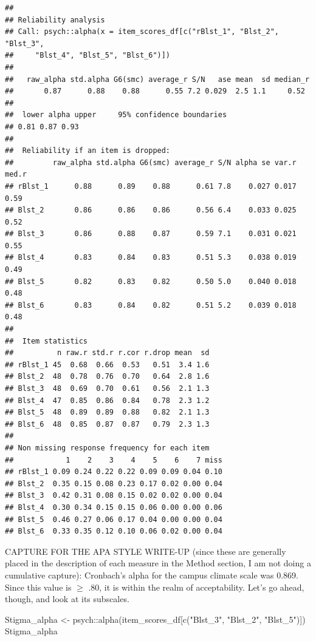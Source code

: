 \documentclass[
]{book}
\newenvironment{Shaded}{\begin{snugshade}}{\end{snugshade}}
\newcommand{\FunctionTok}[1]{\textcolor[rgb]{0.00,0.00,0.00}{#1}}
\newcommand{\NormalTok}[1]{#1}
\newcommand{\OtherTok}[1]{\textcolor[rgb]{0.56,0.35,0.01}{#1}}
\newcommand{\SpecialCharTok}[1]{\textcolor[rgb]{0.00,0.00,0.00}{#1}}
\newcommand{\StringTok}[1]{\textcolor[rgb]{0.31,0.60,0.02}{#1}}
\begin{document}
\begin{verbatim}
## 
## Reliability analysis   
## Call: psych::alpha(x = item_scores_df[c("rBlst_1", "Blst_2", "Blst_3", 
##     "Blst_4", "Blst_5", "Blst_6")])
## 
##   raw_alpha std.alpha G6(smc) average_r S/N   ase mean  sd median_r
##       0.87      0.88    0.88      0.55 7.2 0.029  2.5 1.1     0.52
## 
##  lower alpha upper     95% confidence boundaries
## 0.81 0.87 0.93 
## 
##  Reliability if an item is dropped:
##         raw_alpha std.alpha G6(smc) average_r S/N alpha se var.r med.r
## rBlst_1      0.88      0.89    0.88      0.61 7.8    0.027 0.017  0.59
## Blst_2       0.86      0.86    0.86      0.56 6.4    0.033 0.025  0.52
## Blst_3       0.86      0.88    0.87      0.59 7.1    0.031 0.021  0.55
## Blst_4       0.83      0.84    0.83      0.51 5.3    0.038 0.019  0.49
## Blst_5       0.82      0.83    0.82      0.50 5.0    0.040 0.018  0.48
## Blst_6       0.83      0.84    0.82      0.51 5.2    0.039 0.018  0.48
## 
##  Item statistics 
##          n raw.r std.r r.cor r.drop mean  sd
## rBlst_1 45  0.68  0.66  0.53   0.51  3.4 1.6
## Blst_2  48  0.78  0.76  0.70   0.64  2.8 1.6
## Blst_3  48  0.69  0.70  0.61   0.56  2.1 1.3
## Blst_4  47  0.85  0.86  0.84   0.78  2.3 1.2
## Blst_5  48  0.89  0.89  0.88   0.82  2.1 1.3
## Blst_6  48  0.85  0.87  0.87   0.79  2.3 1.3
## 
## Non missing response frequency for each item
##            1    2    3    4    5    6    7 miss
## rBlst_1 0.09 0.24 0.22 0.22 0.09 0.09 0.04 0.10
## Blst_2  0.35 0.15 0.08 0.23 0.17 0.02 0.00 0.04
## Blst_3  0.42 0.31 0.08 0.15 0.02 0.02 0.00 0.04
## Blst_4  0.30 0.34 0.15 0.15 0.06 0.00 0.00 0.06
## Blst_5  0.46 0.27 0.06 0.17 0.04 0.00 0.00 0.04
## Blst_6  0.33 0.35 0.12 0.10 0.06 0.02 0.00 0.04
\end{verbatim}

CAPTURE FOR THE APA STYLE WRITE-UP (since these are generally placed in the description of each measure in the Method section, I am not doing a cumulative capture): Cronbach's alpha for the campus climate scale was 0.869. Since this value is \(\geq\) .80, it is within the realm of acceptability. Let's go ahead, though, and look at its subscales.

\begin{Shaded}
\begin{Highlighting}[]
\NormalTok{Stigma\_alpha }\OtherTok{\textless{}{-}}\NormalTok{ psych}\SpecialCharTok{::}\FunctionTok{alpha}\NormalTok{(item\_scores\_df[}\FunctionTok{c}\NormalTok{(}\StringTok{"Blst\_3"}\NormalTok{, }\StringTok{"Blst\_2"}\NormalTok{, }\StringTok{"Blst\_5"}\NormalTok{)])}
\NormalTok{Stigma\_alpha}
\end{Highlighting}
\end{Shaded}
\end{document}
